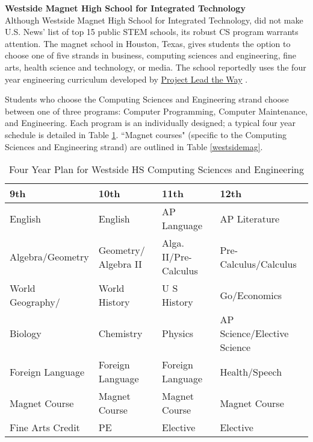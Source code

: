 \textbf{Westside Magnet High School for Integrated Technology} \\
Although Westside Magnet High School for Integrated Technology, did not make U.S. News' list of top 15 public STEM schools, its robust CS program warrants attention. The magnet school in Houston, Texas, gives students the option to choose one of five strands in business, computing sciences and engineering, fine arts, health science and technology, or media. The school reportedly uses the four year engineering curriculum developed by \href{https://www.pltw.org/}{Project Lead the Way} \cite{westside}. \par
Students who choose the Computing Sciences and Engineering strand choose between one of three programs: Computer Programming, Computer Maintenance, and Engineering. Each program is an individually designed; a typical four year schedule is detailed in Table \ref{westsidesched}. ``Magnet courses" (specific to the Computing Sciences and Engineering strand) are outlined in Table \ref{westsidemag}. 
\begin{table}[]
\centering
\caption{Four Year Plan for Westside HS Computing Sciences and Engineering \cite{westside}}
\label{westsidesched}
\begin{tabular}{|l|l|l|l|}
	 \hline
\textbf{9th}     & \textbf{10th}        & \textbf{11th}         & \textbf{12th}               \\ \hline
English          & English              & AP Language           & AP Literature               \\ \hline
Algebra/Geometry & Geometry/ Algebra II & Alga. II/Pre-Calculus & Pre-Calculus/Calculus       \\ \hline
World Geography/ & World History        & U S History           & Go/Economics                \\ \hline
Biology          & Chemistry            & Physics               & AP Science/Elective Science \\ \hline
Foreign Language & Foreign Language     & Foreign Language      & Health/Speech               \\ \hline
\rowcolor[HTML]{FFCC67} Magnet Course   & Magnet Course        & Magnet Course         & Magnet Course   \\ \hline
Fine Arts Credit & PE                   & Elective              & Elective					  \\ \hline                   
\end{tabular}
\end{table}


